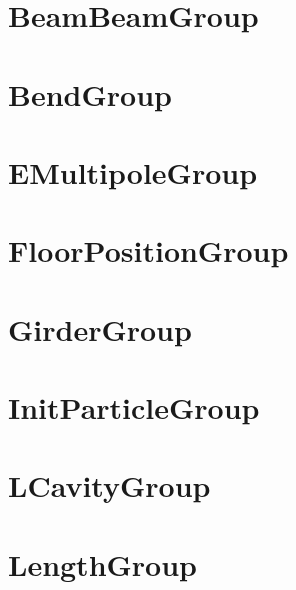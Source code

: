 \section{BeamBeamGroup}
\label{s:beam.beam.g}

\section{BendGroup}
\label{s:bend.g}

\section{EMultipoleGroup}
\label{s:emulitipole.g}

\section{FloorPositionGroup}
\label{s:floor.position.g}

\section{GirderGroup}
\label{s:girder.g}

\section{InitParticleGroup}
\label{s:init.particle.g}

\section{LCavityGroup}
\label{s:lcavity.g}

\section{LengthGroup}
\label{s:length.g}

